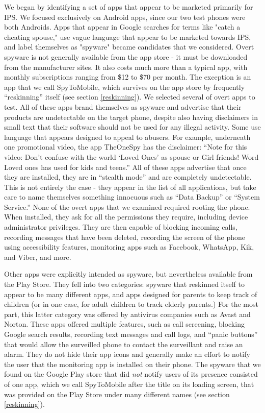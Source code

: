 \documentclass[acmtog]{acmart}
\begin{document}
We began by identifying a set of apps that appear to be 
marketed primarily for IPS. We focused exclusively on Android apps, since our 
two test phones were both Androids. Apps that appear in Google searches for 
terms like 
"catch a cheating spouse," use vague language that appear to be marketed 
towards IPS, and label themselves as "spyware" became candidates that we 
considered. Overt spyware is not generally available from the app store - it 
must be downloaded from the manufacturer sites. It also costs much more than a 
typical app, with monthly 
subscriptions ranging from \$12 to \$70 per month. The exception is an app that 
we call SpyToMobile, which survives on the app store by frequently 
``reskinning'' itself (see section \ref{reskinning}).  
We selected several of overt apps to test. All of these apps brand themselves 
as spyware and advertise that their products are undetectable on the target 
phone, despite also having disclaimers in small text that their software should 
not be used for any illegal activity. Some use language that appears designed 
to appeal to abusers. For example, underneath one promotional 
video, the app TheOneSpy has the disclaimer: ``Note for this video: Don't 
confuse with the world `Loved Ones' as spouse or Girl friends! Word Loved ones 
has used for kids and teens.''\cite{noauthor_theonespy_2013} All of these apps 
advertise that once they are installed, they are in ``stealth mode'' and are 
completely undetectable. This is not entirely the case - they appear in the 
list of all applications, but take care to name themselves something innocuous 
such as ``Data Backup'' or ``System Service.'' None of the overt apps that we 
examined required rooting the phone. When installed, they ask for all the 
permissions they 
require, including device administrator privileges. They are then capable of 
blocking incoming calls, recording messages that have been deleted, recording 
the screen of the phone using accessibility features, monitoring apps such as 
Facebook, WhatsApp, Kik, and Viber, and more.

Other apps were explicitly intended as spyware, but nevertheless available from 
the Play Store. They fell into two categories: spyware that reskinned itself to 
appear to be many different apps, and apps designed for parents to keep track 
of children (or in one case, for adult children to track elderly parents.) For 
the most part, this latter category was offered by antivirus companies such as 
Avast and Norton. These apps offered 
multiple features, such as call screening, blocking Google search results, 
recording text messages and call logs, and ``panic buttons'' that would allow 
the surveilled phone to contact the surveillant and raise an alarm. They do not 
hide their app icons and generally make an effort to notify the user that the 
monitoring app is installed on their phone. The spyware that we found on the 
Google Play store that did \textit{not} notify users of its presence consisted 
of one app, which we call SpyToMobile after the title on its loading screen, 
that was provided on the Play Store under many different names (see section 
\ref{reskinning}). 
\end{document}
